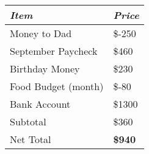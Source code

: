 \documentclass{article}%
\begin{document}
%
\pagestyle{empty}%
\large%
\begin{tabular}{l l}%
\hline%
\hline%
\rowcolor{yellow!10}%
\textit{Item}&\textit{Price}\\%
\hline%
\rowcolor{yellow!3}%
Money to Dad&\${-}250\\%
\rowcolor{yellow!3}%
September Paycheck&\$460\\%
\rowcolor{yellow!3}%
Birthday Money&\$230\\%
\rowcolor{yellow!3}%
Food Budget (month)&\${-}80\\%
\hline%
\rowcolor{yellow!10}%
Bank Account&\$1300\\%
\rowcolor{yellow!10}%
Subtotal&\$360\\%
\hline%
\rowcolor{yellow!16}%
Net Total&\textbf{\$940}\\%
\hline%
\hline%
\end{tabular}%
\end{document}
